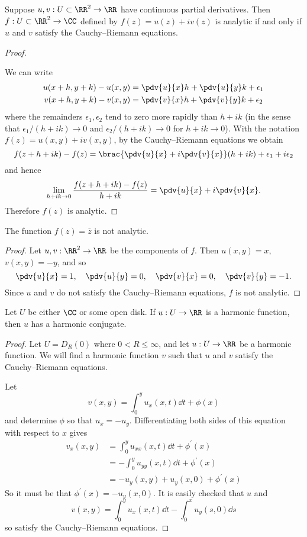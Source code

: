 \begin{theorem}
Suppose $u,v:U\subset\RR^2\to\RR$ have continuous partial derivatives. Then $f:U\subset\RR^2\to\CC$ defined by $f(z)=u(z)+iv(z)$ is analytic if and only if $u$ and $v$ satisfy the Cauchy--Riemann equations.
\end{theorem}

\begin{proof} \

\fbox{$\impliedby$} We can write
\begin{align*}
u(x+h,y+k)-u(x,y)&=\pdv{u}{x}h+\pdv{u}{y}k+\epsilon_1\\
v(x+h,y+k)-v(x,y)&=\pdv{v}{x}h+\pdv{v}{y}k+\epsilon_2
\end{align*}
where the remainders $\epsilon_1,\epsilon_2$ tend to zero more rapidly than $h+ik$ (in the sense that $\epsilon_1/(h+ik)\to0$ and $\epsilon_2/(h+ik)\to0$ for $h+ik\to0$). With the notation $f(z)=u(x,y)+iv(x,y)$, by the Cauchy--Riemann equations we obtain
\[f(z+h+ik)-f(z)=\brac{\pdv{u}{x}+i\pdv{v}{x}}(h+ik)+\epsilon_1+i\epsilon_2\]
and hence
\[\lim_{h+ik\to0}\frac{f(z+h+ik)-f(z)}{h+ik}=\pdv{u}{x}+i\pdv{v}{x}.\]
Therefore $f(z)$ is analytic.


\end{proof}

\begin{example}
The function $f(z)=\bar{z}$ is not analytic.
\begin{proof}
Let $u,v:\RR^2\to\RR$ be the components of $f$. Then $u(x,y) = x$, $v(x,y)=-y$, and so
\[\pdv{u}{x}=1,\quad\pdv{u}{y}=0,\quad\pdv{v}{x}=0,\quad\pdv{v}{y}=-1.\]
Since $u$ and $v$ do not satisfy the Cauchy--Riemann equations, $f$ is not analytic.
\end{proof}
\end{example}

\begin{proposition}
Let $U$ be either $\CC$ or some open disk. If $u:U\to\RR$ is a harmonic function, then $u$ has a harmonic conjugate.
\end{proposition}

\begin{proof}
Let $U=D_R(0)$ where $0<R\le\infty$, and let $u:U\to\RR$ be a harmonic function. We will find a harmonic function $v$ such that $u$ and $v$ satisfy the Cauchy--Riemann equations.

Let
\[v(x,y)=\int_{0}^{y}u_x(x,t)\dd{t}+\phi(x)\]
and determine $\phi$ so that $u_x=-u_y$. Differentiating both sides of this equation with respect to $x$ gives
\begin{align*}
v_x(x,y)&=\int_{0}^{y}u_{xx}(x,t)\dd{t}+\phi^\prime(x)\\
&=-\int_{0}^{y}u_{yy}(x,t)\dd{t}+\phi^\prime(x)\\
&=-u_y(x,y)+u_y(x,0)+\phi^\prime(x)
\end{align*}
So it must be that $\phi^\prime(x)=-u_y(x,0)$. It is easily checked that $u$ and
\[v(x,y)=\int_{0}^{y}u_x(x,t)\dd{t}-\int_{0}^{x}u_y(s,0)\dd{s}\]
so satisfy the Cauchy--Riemann equations.
\end{proof}
\pagebreak

